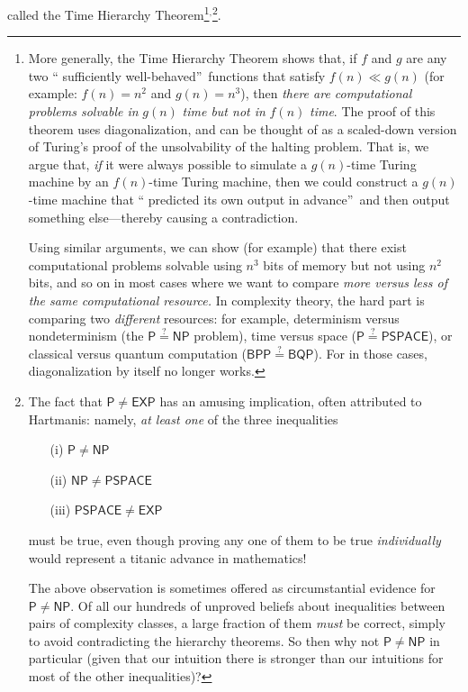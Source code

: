 \documentclass[12pt,onecolumn]{article}%
\begin{document}
\cite{hs} called the Time Hierarchy Theorem\footnote{More generally, the Time
Hierarchy Theorem shows that, if $f$ and $g$ are any two \textquotedblleft
sufficiently well-behaved\textquotedblright\  functions that satisfy $f(
n)  \ll g(  n)  $ (for example: $f(  n)  =n^{2}%
$ and $g(  n)  =n^{3}$), then \textit{there are computational
problems solvable in }$g(  n)  $\textit{ time but not in
}$f(  n)  $\textit{ time}. The proof of this theorem uses
diagonalization, and can be thought of as a scaled-down version of Turing's
proof of the unsolvability of the halting problem. That is, we argue that,
\textit{if} it were always possible to simulate a $g(  n)  $-time
Turing machine by an $f(  n)  $-time Turing machine, then we could
construct a $g(  n)  $-time machine that \textquotedblleft
predicted its own output in advance\textquotedblright\  and then output
something else---thereby causing a contradiction.
\par
Using similar arguments, we can show (for example) that there exist
computational problems solvable using $n^{3}$ bits of memory but not using
$n^{2}$ bits, and so on in most cases where we want to compare \textit{more
versus less of the same computational resource.} In complexity theory, the
hard part is comparing two \textit{different} resources: for example,
determinism versus nondeterminism (the $\mathsf{P}\overset{?}{=}\mathsf{NP}%
$ problem), time versus space ($\mathsf{P\overset{?}{=}PSPACE}$), or
classical versus quantum computation ($\mathsf{BPP\overset{?}{=}BQP}$). For
in those cases, diagonalization by itself no longer works.}$^{,}$\footnote{The
fact that $\mathsf{P}\neq\mathsf{EXP}$ has an amusing implication, often
attributed to Hartmanis: namely, \textit{at least one} of the three
inequalities
\par
\begin{enumerate}
\item[(i)] $\mathsf{P}\neq\mathsf{NP}$
\par
\item[(ii)] $\mathsf{NP}\neq\mathsf{PSPACE}$
\par
\item[(iii)] $\mathsf{PSPACE}\neq\mathsf{EXP}$
\end{enumerate}
\par
\noindent must be true, even though proving any one of them to be true
\textit{individually} would represent a titanic advance in mathematics!
\par
The above observation is sometimes offered as circumstantial evidence for
$\mathsf{P}\neq\mathsf{NP}$. Of all our hundreds of unproved beliefs about
inequalities between pairs of complexity classes, a large fraction of them
\textit{must} be correct, simply to avoid contradicting the hierarchy
theorems. So then why not $\mathsf{P}\neq\mathsf{NP}$ in particular (given
that our intuition there is stronger than our intuitions for most of the other
inequalities)?}.
\end{document}
